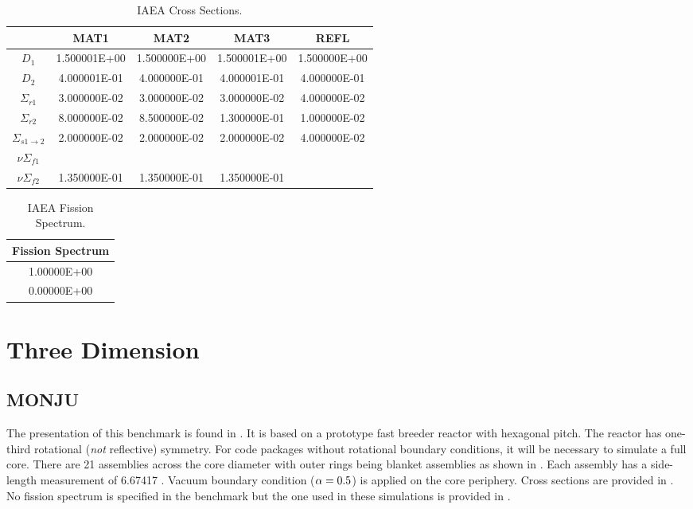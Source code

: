     \begin{table}
      \caption{IAEA Cross Sections.}
      \label{tab:iaeaxs}
      \begin{center}
        \begin{tabular}{ccccc}
          \toprule
          &MAT1&MAT2&MAT3&REFL\\
          \midrule
          $D_1$&1.500001E+00&1.500000E+00&1.500001E+00&1.500000E+00\\
          $D_2$&4.000001E-01&4.000000E-01&4.000001E-01&4.000000E-01\\
          $\Sigma_{r1}$&3.000000E-02&3.000000E-02&3.000000E-02&4.000000E-02\\
          $\Sigma_{r2}$&8.000000E-02&8.500000E-02&1.300000E-01&1.000000E-02\\
          $\Sigma_{s 1\rightarrow 2}$&2.000000E-02&2.000000E-02&2.000000E-02&4.000000E-02\\
          $ \nu \Sigma_{f1}$&&&&\\
          $ \nu \Sigma_{f2}$&1.350000E-01&1.350000E-01&1.350000E-01&\\
          \bottomrule
        \end{tabular}
      \end{center}
    \end{table}
    \begin{table}
      \caption{IAEA Fission Spectrum.}
      \label{tab:iaeachi}
      \begin{center}
        \begin{tabular}{c}
          \toprule
          Fission Spectrum \\
          \midrule
          1.00000E+00  \\
          0.00000E+00  \\
          \bottomrule
        \end{tabular}
      \end{center}
    \end{table}
\section{Three Dimension}
  \subsection{MONJU}
    \label{sec:monju}
    The presentation of this benchmark is found in \cite{monjuBenchmark}. It is
    based on a prototype fast breeder reactor with hexagonal pitch. The reactor
    has one-third rotational (\textit{not} reflective) symmetry. For code
    packages without rotational boundary conditions, it will be necessary to
    simulate a full core. There are 21 assemblies across the core diameter with
    outer rings being blanket assemblies as shown in .
    Each assembly has a side-length measurement of 6.67417 . Vacuum
    boundary condition ($\alpha = 0.5$) is applied on the core periphery. Cross
    sections are provided in . No fission spectrum is
    specified in the benchmark but the one used in these simulations is provided
    in .

